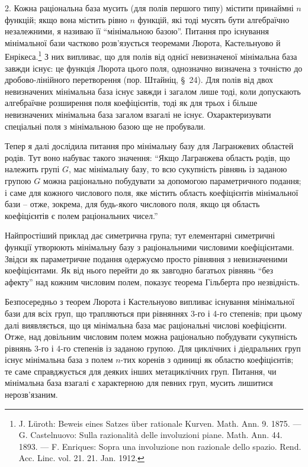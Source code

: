 \documentclass[11pt]{article}
\begin{document}
2. Кожна раціональна база мусить (для полів першого типу) містити принаймні $n$ функцій; якщо вона містить рівно $n$ функцій, які тоді мусять бути алгебраїчно незалежними, я називаю її ``мінімальною базою''. Питання про існування мінімальної бази частково розв'язується теоремами Люрота, Кастельнуово й Енрікеса.\footnote{J. Lüroth: Beweis eines Satzes über rationale Kurven. Math. Ann. 9. 1875. --- G. Castelnuovo: Sulla razionalità delle involuzioni piane. Math. Ann. 44. 1893. --- F. Enriques: Sopra una involuzione non razionale dello spazio. Rend. Acc. Linc. vol. 21. 21. Jan. 1912.} З них випливає, що для полів від однієї невизначеної мінімальна база завжди існує: це функція Люрота цього поля, однозначно визначена з точністю до дробово-лінійного перетворення (пор. Штайніц, \S\ 24). Для полів від двох невизначених мінімальна база існує завжди і загалом лише тоді, коли допускають алгебраїчне розширення поля коефіцієнтів, тоді як для трьох і більше невизначених мінімальна база загалом взагалі не існує. Охарактеризувати спеціальні поля з мінімальною базою ще не пробували.

Тепер я далі дослідила питання про мінімальну базу для Лагранжевих областей родів. Тут воно набуває такого значення: ``Якщо Лагранжева область родів, що належить групі $G$, має мінімальну базу, то всю сукупність рівнянь із заданою групою $G$ можна раціонально побудувати за допомогою параметричного подання; і саме для кожного числового поля, яке містить область коефіцієнтів мінімальної бази -- отже, зокрема, для будь-якого числового поля, якщо ця область коефіцієнтів є полем раціональних чисел.''

Найпростіший приклад дає симетрична група; тут елементарні симетричні функції утворюють мінімальну базу з раціональними числовими коефіцієнтами. Звідси як параметричне подання одержуємо просто рівняння з невизначеними коефіцієнтами. Як від нього перейти до як завгодно багатьох рівнянь ``без афекту'' над кожним числовим полем, показує теорема Гільберта про незвідність.

Безпосередньо з теорем Люрота і Кастельнуово випливає існування мінімальної бази для всіх груп, що трапляються при рівняннях 3-го і 4-го степенів; при цьому далі виявляється, що ця мінімальна база має раціональні числові коефіцієнти. Отже, над довільним числовим полем можна раціонально побудувати сукупність рівнянь 3-го і 4-го степенів із заданою групою. Для циклічних і діедральних груп існує мінімальна база з полем $n$-тих коренів з одиниці як областю коефіцієнтів; те саме справджується для деяких інших метациклічних груп. Питання, чи мінімальна база взагалі є характерною для певних груп, мусить лишитися нерозв'язаним.
\end{document}
